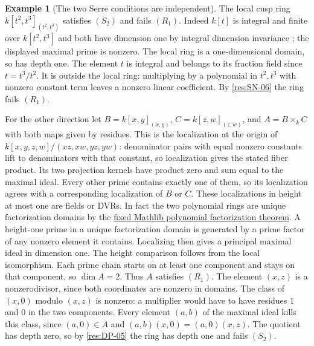 \documentclass[11pt,oneside,openany]{book}
\theoremstyle{definition}
\newtheorem{example}[theorem]{Example}
\theoremstyle{remark}
\begin{document}
\begin{example}[The two Serre conditions are independent]\label{res:SN-12}
The local cusp ring $k[t^2,t^3]_{(t^2,t^3)}$ satisfies $(S_2)$
and fails $(R_1)$. Indeed $k[t]$ is integral and finite over
$k[t^2,t^3]$ and both have dimension one by integral dimension
invariance \cite[Chapter 6]{p103}; the displayed maximal prime
is nonzero. The local ring is a one-dimensional domain, so has
depth one. The element $t$ is integral and belongs to its
fraction field since $t=t^3/t^2$. It is outside the local ring:
multiplying by a polynomial in $t^2,t^3$ with nonzero constant
term leaves a nonzero linear coefficient. By \ref{res:SN-06}
the ring fails $(R_1)$.

For the other direction let $B=k[x,y]_{(x,y)}$,
$C=k[z,w]_{(z,w)}$, and $A=B\times_k C$ with both maps given
by residues. This is the localization at the origin of
$k[x,y,z,w]/(xz,xw,yz,yw)$: denominator pairs with equal
nonzero constants lift to denominators with that constant,
so localization gives the stated fiber product. Its two
projection kernels have product zero and sum equal to the
maximal ideal. Every other prime contains exactly one of
them, so its localization agrees with a corresponding
localization of $B$ or $C$. These localizations in height
at most one are fields or DVRs. In fact the two polynomial
rings are unique factorization domains by the
\href{https://github.com/leanprover-community/mathlib4/blob/56a005855ea17e0b0958f73ec801ae140b0a1679/Mathlib/RingTheory/Polynomial/UniqueFactorization.lean\#L128}{fixed Mathlib polynomial factorization theorem}.
A height-one prime in a unique
factorization domain is generated by a prime factor of any
nonzero element it contains. Localizing then gives a principal
maximal ideal in dimension one. The height comparison follows
from the local isomorphism. Each prime chain starts on at
least one component and stays on that component, so $\dim A=2$.
Thus $A$ satisfies $(R_1)$. The element $(x,z)$ is a
nonzerodivisor, since both coordinates are nonzero in
domains. The class of $(x,0)$ modulo $(x,z)$ is nonzero:
a multiplier would have to have residues $1$ and $0$ in
the two components. Every element $(a,b)$ of the maximal
ideal kills this class, since $(a,0)\in A$ and
$(a,b)(x,0)=(a,0)(x,z)$. The quotient has depth zero,
so by \ref{res:DP-05} the ring has depth one and fails $(S_2)$.
\end{example}
\end{document}
